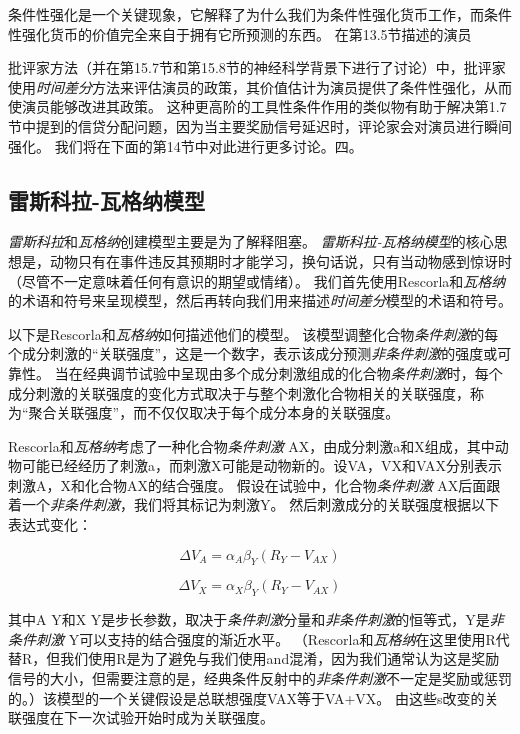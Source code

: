 条件性强化是一个关键现象，它解释了为什么我们为条件性强化货币工作，而条件性强化货币的价值完全来自于拥有它所预测的东西。
在第13.5节描述的演员{批评家方法（并在第15.7节和第15.8节的神经科学背景下进行了讨论）中，批评家使用\textit{时间差分}方法来评估演员的政策，其价值估计为演员提供了条件性强化，从而使演员能够改进其政策。
这种更高阶的工具性条件作用的类似物有助于解决第1.7节中提到的信贷分配问题，因为当主要奖励信号延迟时，评论家会对演员进行瞬间强化。
我们将在下面的第14节中对此进行更多讨论。四。


\subsection{雷斯科拉-瓦格纳模型} \label{sec:rescorla_wagner}

\textit{雷斯科拉}和\textit{瓦格纳}创建模型主要是为了解释阻塞。
\textit{雷斯科拉-瓦格纳模型}的核心思想是，动物只有在事件违反其预期时才能学习，换句话说，只有当动物感到惊讶时（尽管不一定意味着任何有意识的期望或情绪）。
我们首先使用Rescorla和\textit{瓦格纳}的术语和符号来呈现模型，然后再转向我们用来描述\textit{时间差分}模型的术语和符号。


以下是Rescorla和\textit{瓦格纳}如何描述他们的模型。
该模型调整化合物\textit{条件刺激}的每个成分刺激的“关联强度”，这是一个数字，表示该成分预测\textit{非条件刺激}的强度或可靠性。
当在经典调节试验中呈现由多个成分刺激组成的化合物\textit{条件刺激}时，每个成分刺激的关联强度的变化方式取决于与整个刺激化合物相关的关联强度，称为“聚合关联强度”，而不仅仅取决于每个成分本身的关联强度。


Rescorla和\textit{瓦格纳}考虑了一种化合物\textit{条件刺激} AX，由成分刺激a和X组成，其中动物可能已经经历了刺激a，而刺激X可能是动物新的。设VA，VX和VAX分别表示刺激A，X和化合物AX的结合强度。
假设在试验中，化合物\textit{条件刺激} AX后面跟着一个\textit{非条件刺激}，我们将其标记为刺激Y。
然后刺激成分的关联强度根据以下表达式变化：

\begin{equation}
	\Delta V_A = \alpha_A \beta_Y
		(R_Y - V_{AX})
\end{equation}


\begin{equation}
	\Delta V_X = 
		\alpha_X \beta_Y
		(R_Y - V_{AX})
\end{equation}

其中A Y和X Y是步长参数，取决于\textit{条件刺激}分量和\textit{非条件刺激}的恒等式，Y是\textit{非条件刺激} Y可以支持的结合强度的渐近水平。
（Rescorla和\textit{瓦格纳}在这里使用R代替R，但我们使用R是为了避免与我们使用and混淆，因为我们通常认为这是奖励信号的大小，但需要注意的是，经典条件反射中的\textit{非条件刺激}不一定是奖励或惩罚的。）该模型的一个关键假设是总联想强度VAX等于VA+VX。
由这些s改变的关联强度在下一次试验开始时成为关联强度。


}

